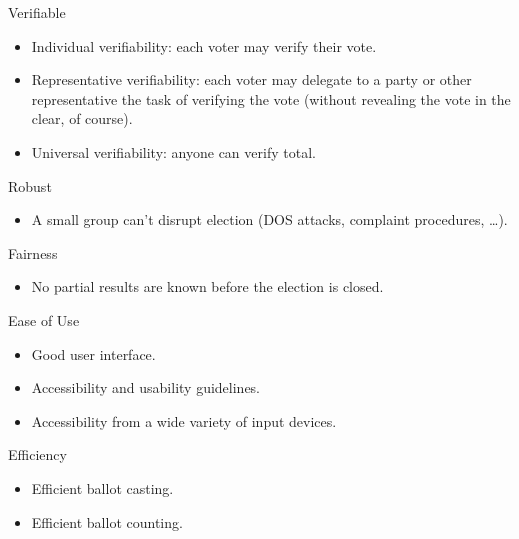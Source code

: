 \documentclass[utf8]{beamer}
\begin{document}
\begin{frame}{Verifiable}

\begin{itemize}
\item Individual verifiability: each voter may verify their vote.
\item Representative verifiability: each voter may delegate to a party
  or other representative the task of verifying the vote (without
  revealing the vote in the clear, of course).
\item Universal verifiability: anyone can verify total.
\end{itemize}

\end{frame}

\begin{frame}{Robust}

\begin{itemize}
\item A small group can't disrupt election (DOS attacks, complaint
  procedures, \ldots).
\end{itemize}

\end{frame}

\begin{frame}{Fairness}

\begin{itemize}
  \item No partial results are known before the election is closed.
  \end{itemize}
  
\end{frame}

\begin{frame}{Ease of Use}

\begin{itemize}
  \item Good user interface.
  \item Accessibility and usability guidelines.
  \item Accessibility from a wide variety of input devices.
\end{itemize}

\end{frame}

\begin{frame}{Efficiency}

  \begin{itemize}
  \item Efficient ballot casting.
  \item Efficient ballot counting.
  \end{itemize}
  
\end{frame}
\end{document}

